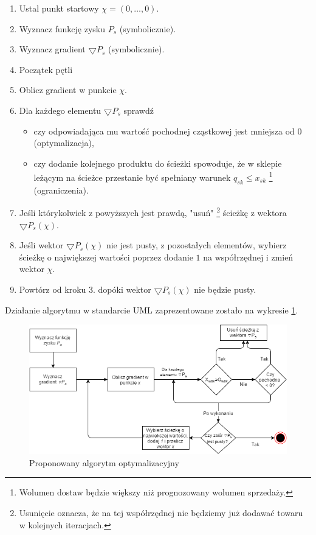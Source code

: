 \documentclass[polish, twoside, 12pt, a4paper]{article}
\theoremstyle{definition}
\theoremstyle{plain}
\theoremstyle{remark}
\begin{document}
\clearpage

\begin{enumerate} 
	\item[] Ustal punkt startowy $\chi = (0,\ldots,0)$.
	\item Wyznacz funkcję zysku $P_s$ (symbolicznie).
	\item Wyznacz gradient $\bigtriangledown P_s$ (symbolicznie).
	\item[] Początek pętli
	\item Oblicz gradient w punkcie $\chi$. 
	\item Dla każdego elementu  $\bigtriangledown P_s$ sprawdź
		\begin{itemize}
			\item czy odpowiadająca mu wartość pochodnej cząstkowej jest mniejsza od $0$ (optymalizacja),
			\item czy dodanie kolejnego produktu do ścieżki spowoduje, że w sklepie leżącym na ścieżce przestanie być spełniany warunek $q_{sk} \le x_{sk}$ \footnote{Wolumen dostaw będzie większy niż prognozowany wolumen sprzedaży.} (ograniczenia). 
		\end{itemize}
	\item Jeśli którykolwiek z powyższych jest prawdą, "usuń" \footnote{Usunięcie oznacza, że na tej współrzędnej nie będziemy już dodawać towaru w kolejnych iteracjach.} ścieżkę z wektora  $\bigtriangledown P_s(\chi)$. 
	\item Jeśli wektor $ \bigtriangledown P_s(\chi)$ nie jest pusty, z pozostałych elementów, wybierz ścieżkę o największej wartości poprzez dodanie $1$ na współrzędnej i zmień wektor $\chi$.
	\item Powtórz od kroku 3. dopóki wektor $\bigtriangledown P_s(\chi)$ nie będzie pusty.
\end{enumerate}

Działanie algorytmu w standarcie UML zaprezentowane zostało na wykresie \ref{fig:diagramoptymalizacyny}.

\begin{figure}
  \centering
\includegraphics[width=\linewidth]{pictures/diagramoptymalizacyny.png}
  \caption{Proponowany algorytm optymalizacyjny}
  \label{fig:diagramoptymalizacyny}

\end{figure}
\end{document}
